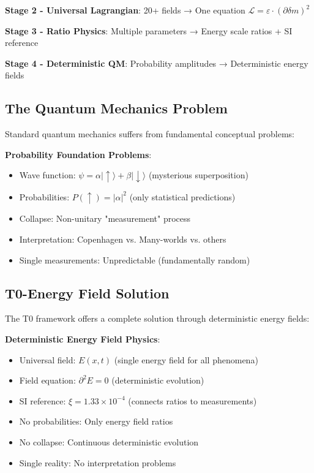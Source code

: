 \documentclass[12pt,a4paper]{article}
\newcommand{\Efield}{E}
\newcommand{\xipar}{\xi}
\begin{document}
	\textbf{Stage 2 - Universal Lagrangian}: 20+ fields → One equation $\mathcal{L} = \varepsilon \cdot (\partial \delta m)^2$
	
	\textbf{Stage 3 - Ratio Physics}: Multiple parameters → Energy scale ratios + SI reference
	
	\textbf{Stage 4 - Deterministic QM}: Probability amplitudes → Deterministic energy fields
	
	\subsection{The Quantum Mechanics Problem}
	
	Standard quantum mechanics suffers from fundamental conceptual problems:
	
	\begin{tcolorbox}[colback=red!5!white,colframe=red!75!black,title=Standard QM Problems]
		\textbf{Probability Foundation Problems}:
		\begin{itemize}
			\item Wave function: $\psi = \alpha|{\uparrow}\rangle + \beta|{\downarrow}\rangle$ (mysterious superposition)
			\item Probabilities: $P(\uparrow) = |\alpha|^2$ (only statistical predictions)
			\item Collapse: Non-unitary "measurement" process
			\item Interpretation: Copenhagen vs. Many-worlds vs. others
			\item Single measurements: Unpredictable (fundamentally random)
		\end{itemize}
	\end{tcolorbox}
	
	\subsection{T0-Energy Field Solution}
	
	The T0 framework offers a complete solution through deterministic energy fields:
	
	\begin{tcolorbox}[colback=blue!5!white,colframe=blue!75!black,title=T0 Deterministic Foundation]
		\textbf{Deterministic Energy Field Physics}:
		\begin{itemize}
			\item Universal field: $\Efield(x,t)$ (single energy field for all phenomena)
			\item Field equation: $\partial^2 \Efield = 0$ (deterministic evolution)
			\item SI reference: $\xipar = 1.33 \times 10^{-4}$ (connects ratios to measurements)
			\item No probabilities: Only energy field ratios
			\item No collapse: Continuous deterministic evolution
			\item Single reality: No interpretation problems
		\end{itemize}
	\end{tcolorbox}
	
\end{document}
